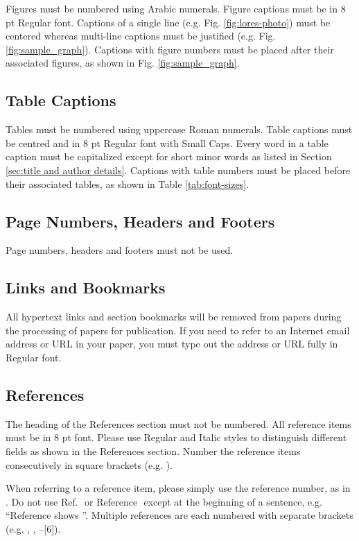 Figures must be numbered using Arabic numerals.  Figure captions must
be in 8 pt Regular font.  Captions of a single line (e.g. Fig.
\ref{fig:lores-photo}) must be centered whereas multi-line captions
must be justified (e.g. Fig.  \ref{fig:sample_graph}).  Captions with
figure numbers must be placed after their associated figures, as shown
in Fig. \ref{fig:sample_graph}.

\subsection{Table Captions}

Tables must be numbered using uppercase Roman numerals.  Table
captions must be centred and in 8 pt Regular font with Small Caps.
Every word in a table caption must be capitalized except for short
minor words as listed in Section \ref{sec:title and author details}.
Captions with table numbers must be placed before their associated
tables, as shown in Table \ref{tab:font-sizes}.

\subsection{Page Numbers, Headers and Footers}

Page numbers, headers and footers must not be used.

\subsection{Links and Bookmarks}

All hypertext links and section bookmarks will be removed from
papers during the processing of papers for publication.  If you
need to refer to an Internet email address or URL in your paper,
you must type out the address or URL fully in Regular font.

\subsection{References}

The heading of the References section must not be numbered.
All reference items must be in 8 pt font.  Please
use Regular and Italic styles to distinguish different fields as
shown in the References section. Number the reference items
consecutively in square brackets (e.g. \cite{IEEEexample:book}).

When referring to a reference item, please simply use the
reference number, as in \cite{IEEEexample:bookwithseriesvolume}.
Do not use Ref. \cite{IEEEexample:article_typical} or
Reference \cite{IEEEexample:article_typical} except at the
beginning of a sentence, e.g.  ``Reference
\cite{IEEEexample:article_typical} shows ''.  Multiple
references are each numbered with separate brackets (e.g.
\cite{IEEEexample:bookwithseriesvolume},
\cite{IEEEexample:article_typical},
\cite{IEEEexample:confwithpaper}--[6]).

